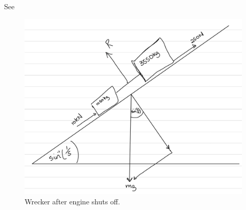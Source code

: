 \begin{subquestions}
\begin{subsubquestions}
	\end{subsubquestions}

		
		\subquestion
		
		\begin{subsubquestions}
			
			\subsubquestion 
			
			See 
			\begin{figure}[H]
				\begin{center}
					\includegraphics[scale=0.25]{../2016/figures/2016q5-3}
					\caption{\label{2016:q55:Diagram2} Wrecker after engine shuts off.}
				\end{center}
			\end{figure}
			
			
			\subsubquestion
			

\end{subsubquestions}
\end{subquestions}
